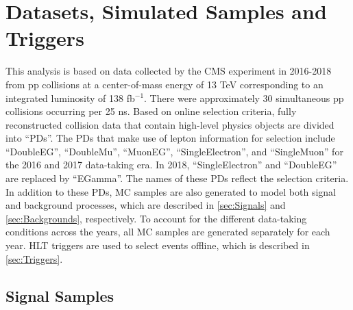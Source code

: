 \chapter{Datasets, Simulated Samples and Triggers}
\label{chap:Samples}

This analysis is based on data collected by the \ac{CMS} experiment in 2016-2018 from pp collisions at a center-of-mass energy of 13 TeV corresponding to an integrated luminosity of 138 fb$^{-1}$. There were approximately 30 simultaneous pp collisions occurring per 25 ns. Based on online selection criteria, fully reconstructed collision data that contain high-level physics objects are divided into ``\acp{PD}''. The \acp{PD} that make use of lepton information for selection include ``DoubleEG'', ``DoubleMu'', ``MuonEG'', ``SingleElectron'', and ``SingleMuon'' for the 2016 and 2017 data-taking era. In 2018, ``SingleElectron'' and ``DoubleEG'' are replaced by ``EGamma''. The names of these \acp{PD} reflect the selection criteria. In addition to these \acp{PD}, \ac{MC} samples are also generated to model both signal and background processes, which are described in \autoref{sec:Signals} and \autoref{sec:Backgrounds}, respectively. To account for the different data-taking conditions across the years, all \ac{MC} samples are generated separately for each year. \ac{HLT} triggers are used to select events offline, which is described in \autoref{sec:Triggers}.

\section{Signal Samples}
\label{sec:Signals}

